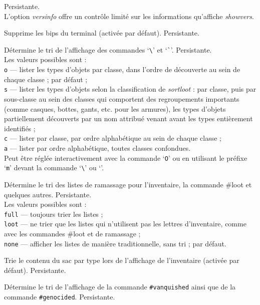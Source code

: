\documentclass[titlepage]{article}
\begin{document}
\begin{description}[font=\mdseries\itshape]
Persistante.
\\
L'option \textit{versinfo}
offre un contrôle limité sur les informations
qu'affiche \textit{showvers}.
\item[silent]
Supprime les bips du terminal (activée par défaut). Persistante.
\item[sortdiscoveries]
Détermine le tri de l'affichage des commandes `\texttt{\textbackslash}'
et `\texttt{\`{}}'.
Persistante.
\\
Les valeurs possibles sont :
\\
\texttt{o} --- lister les types d'objets par classe, dans l'ordre de découverte au sein de chaque classe ;
par défaut ;
\\
\texttt{s} --- lister les types d'objets selon la classification de \textit{sortloot} :
par classe, puis par sous-classe au sein des classes qui
comportent des regroupements importants (comme casques, bottes, gants, etc.
pour les armures), les types d'objets partiellement découverts par un nom attribué
venant avant les types entièrement identifiés ;
\\
\texttt{c} --- lister par classe, par ordre alphabétique au sein de chaque classe ;\\
\texttt{a} --- lister par ordre alphabétique, toutes classes confondues.\\
Peut être réglée interactivement avec la commande `\texttt{O}' ou en utilisant
le préfixe `\texttt{m}' devant la commande `\texttt{\textbackslash}'
ou `\texttt{\textasciigrave}'.
\item[sortloot]
Détermine le tri des listes de ramassage pour l'inventaire,
la commande \#loot et quelques autres. Persistante.
\\
Les valeurs possibles sont :
\\
\texttt{full} --- toujours trier les listes ;\\
\texttt{loot} --- ne trier que les listes qui n'utilisent pas les lettres
       d'inventaire, comme avec les commandes \#loot et de ramassage ;\\
\texttt{none} --- afficher les listes de manière traditionnelle, sans tri ; par défaut.
\item[sortpack]
Trie le contenu du sac par type lors de l'affichage de l'inventaire (activée par défaut).
Persistante.
\item[sortvanquished]
Détermine le tri de l'affichage de la commande \texttt{\#vanquished}
ainsi que de la commande \texttt{\#genocided}.
Persistante.

\end{description}
\end{document}
